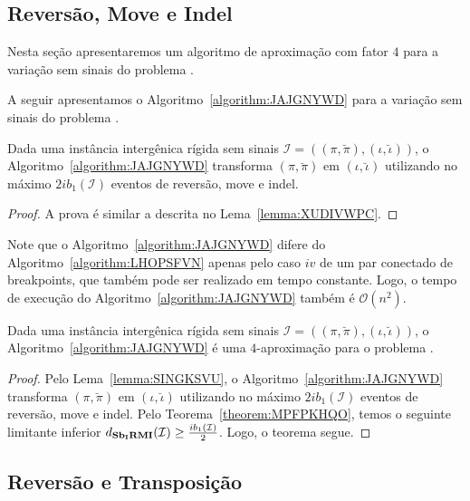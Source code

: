 \subsection{Reversão, Move e Indel}

Nesta seção apresentaremos um algoritmo de aproximação com fator $4$ para a variação sem sinais do problema \SbIRMI{}. 

A seguir apresentamos o Algoritmo~\ref{algorithm:JAJGNYWD} para a variação sem sinais do problema \SbIRMI{}.



\begin{lemma}\label{lemma:SINGKSVU}
Dada uma instância intergênica rígida sem sinais $\mathcal{I}=((\pi,\breve\pi),(\iota,\breve\iota))$, o Algoritmo~\ref{algorithm:JAJGNYWD} transforma $(\pi,\breve\pi)$ em $(\iota,\breve\iota)$ utilizando no máximo $2ib_1(\mathcal{I})$ eventos de reversão, move e indel.
\end{lemma}
\begin{proof}
  A prova é similar a descrita no Lema~\ref{lemma:XUDIVWPC}.
\end{proof}

Note que o Algoritmo~\ref{algorithm:JAJGNYWD} difere do Algoritmo~\ref{algorithm:LHOPSFVN} apenas pelo caso $iv$ de um par conectado de breakpoints, que também pode ser realizado em tempo constante. Logo, o tempo de execução do Algoritmo~\ref{algorithm:JAJGNYWD} também é $\mathcal{O}(n^2)$.

\begin{theorem}\label{theorem:WSCHLXXJ}
Dada uma instância intergênica rígida sem sinais $\mathcal{I}=((\pi,\breve\pi),(\iota,\breve\iota))$, o Algoritmo~\ref{algorithm:JAJGNYWD} é uma $4$-aproximação para o problema \SbIRMI{}.
\end{theorem}
\begin{proof}
Pelo Lema~\ref{lemma:SINGKSVU}, o Algoritmo~\ref{algorithm:JAJGNYWD} transforma $(\pi,\breve\pi)$ em $(\iota,\breve\iota)$ utilizando no máximo $2ib_1(\mathcal{I})$ eventos de reversão, move e indel. Pelo Teorema~\ref{theorem:MPFPKHQO}, temos o seguinte limitante inferior $d_{\textbf{Sb\textsubscript{I}RMI}}(\mathcal{I}) \ge \frac{ib_1(\mathcal{I})}{2}$. Logo, o teorema segue. 
\end{proof}

\subsection{Reversão e Transposição}

